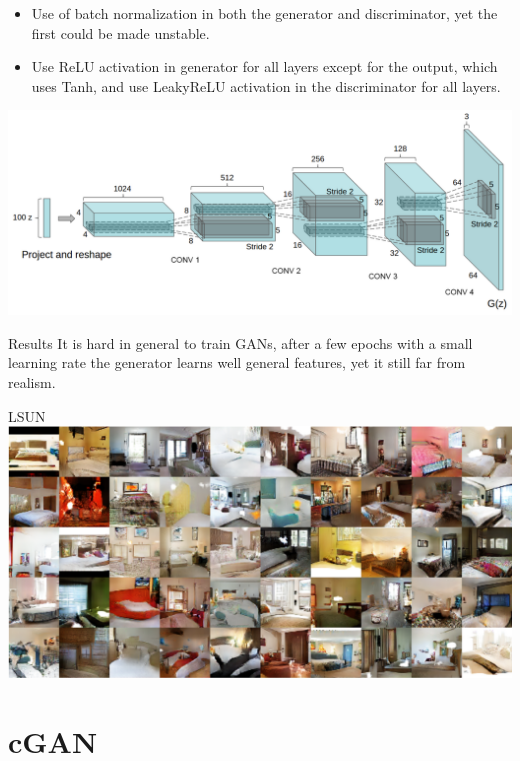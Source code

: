 \documentclass{beamer}
\begin{document}
\begin{frame}
    \begin{itemize}
        \item Use of batch normalization in both the generator and discriminator, yet the first could be made unstable.
        \item Use ReLU activation in generator for all layers except for the output, which uses Tanh, and use LeakyReLU activation in the discriminator for all layers.
    \end{itemize}
\end{frame}

\begin{frame}
    \centering
    \includegraphics[scale=0.37]{images/dcgan-scheme.png}
\end{frame}

\begin{frame}{Results}
    It is hard in general to train GANs, after a few epochs with a small learning rate the generator learns well general features, yet it still far from realism.
\end{frame}

\begin{frame}{LSUN}
    \centering
    \includegraphics[scale=0.35]{images/dcgan-results.png}
\end{frame}

\section{cGAN}
\end{document}
